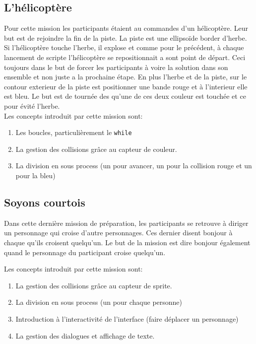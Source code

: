 \subsection{L'hélicoptère}
Pour cette mission les participants étaient au commandes d'un hélicoptère. Leur but est de rejoindre la fin de la piste. La piste est une ellipsoïde border d'herbe. Si l'hélicoptère touche l'herbe, il explose et comme pour le précédent, à chaque lancement de scripte l'hélicoptère se repositionnait a sont point de départ. Ceci toujours dans le but de forcer les participants à voire la solution dans son ensemble et non juste a la prochaine étape. En plus l'herbe et de la piste, sur le contour exterieur de la piste est positionner une bande rouge et à l'interieur elle est bleu. Le but est de tournée des qu'une de ces deux couleur est touchée et ce pour évité l'herbe.\\

Les concepts introduit par cette mission sont:
\begin{enumerate}
\item Les boucles, particulièrement le \texttt{while}
\item La gestion des collisions grâce au capteur de couleur.
\item La division en sous process (un pour avancer, un pour la collision rouge et un pour la bleu)
\end{enumerate}

\subsection{Soyons courtois}
Dans cette dernière mission de préparation, les participants se retrouve à diriger un personnage qui croise d'autre personnages. Ces dernier disent bonjour à chaque qu'ils croisent quelqu'un. Le but de la mission est dire bonjour également quand le personnage du participant croise quelqu'un.

Les concepts introduit par cette mission sont:
\begin{enumerate}
\item La gestion des collisions grâce au capteur de sprite.
\item La division en sous process (un pour chaque personne)
\item Introduction à l'interactivité de l'interface (faire déplacer un personnage)
\item La gestion des dialogues et affichage de texte.
\end{enumerate}


